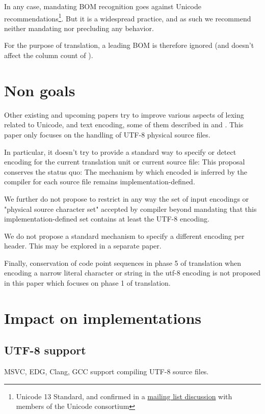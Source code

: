 \documentclass{wg21}
\begin{document}
In any case, mandating BOM recognition goes against Unicode recommendations\footnote{Unicode 13 Standard, and confirmed in a \href{https://corp.unicode.org/mailman/private/unicode/2020-June/008716.html}{mailing list discussion} with members of the Unicode consortium}. But it is a widespread practice, and as such we recommend neither mandating nor precluding any behavior.

For the purpose of translation, a leading BOM is therefore ignored (and doesn't affect the column count of ).

\section{Non goals}

Other existing and upcoming papers try to improve various aspects of lexing related to Unicode, and text encoding, some of them described in 
and .
This paper only focuses on the handling of UTF-8 physical source files.

In particular, it doesn't try to provide a standard  way to specify or detect encoding for the current translation unit or current source file:
This proposal conserves the status quo: The mechanism by which encoded is inferred by the compiler for each source file remains implementation-defined.

We further do not propose to restrict in any way the set of input encodings or "physical source character set"
accepted by compiler beyond mandating that this implementation-defined set contains at least the UTF-8 encoding.

We do not propose a standard mechanism to specify a different encoding per header. This may be explored in a separate paper.

Finally, conservation of code point sequences in phase 5 of translation when encoding a narrow literal character or string in the utf-8
encoding is not proposed in this paper which focuses on phase 1 of translation.




\section{Impact on implementations}

\subsection{UTF-8 support}
MSVC, EDG, Clang, GCC support compiling UTF-8 source files.
\end{document}

